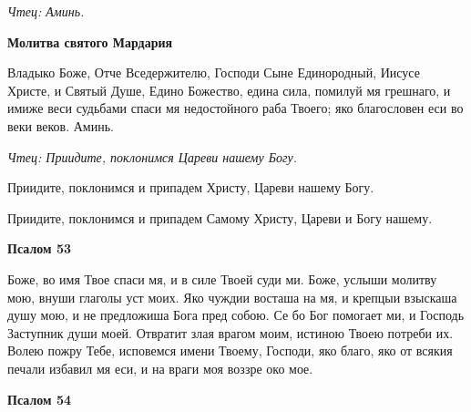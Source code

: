 \itshape Чтец:\normalfont{} Аминь.


\medskip
\bfseries Молитва святого Мардария\normalfont{}



Владыко Боже, Отче Вседержителю, Господи Сыне Единородный, Иисусе Христе, и Святый Душе, Едино Божество, едина сила, помилуй мя грешнаго, и имиже веси судьбами спаси мя недостойного раба Твоего; яко благословен еси во веки веков. Аминь.

\mychapterending

 


\itshape Чтец\normalfont{}: Приидите, поклонимся Цареви нашему Богу.



Приидите, поклонимся и припадем Христу, Цареви нашему Богу.



Приидите, поклонимся и припадем Самому Христу, Цареви и Богу нашему.


\medskip
\bfseries Псалом 53\normalfont{}

Боже, во имя Твое спаси мя, и в силе Твоей суди ми. Боже, услыши молитву мою, внуши глаголы уст моих. Яко чуждии восташа на мя, и крепцыи взыскаша душу мою, и не предложиша Бога пред собою. Се бо Бог помогает ми, и Господь Заступник души моей. Отвратит злая врагом моим, истиною Твоею потреби их. Волею пожру Тебе, исповемся имени Твоему, Господи, яко благо, яко от всякия печали избавил мя еси, и на враги моя воззре око мое.


\medskip
\bfseries Псалом 54\normalfont{}


